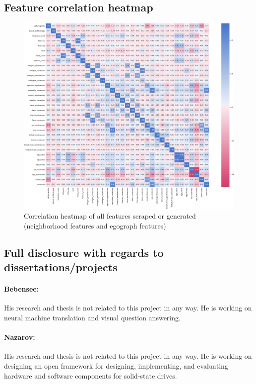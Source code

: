 \subsection{Feature correlation heatmap} \label{fig:corr}

\begin{figure}[H]
    \centering
    \includegraphics[width=\textwidth]{FIG/corr.pdf}
    \caption{Correlation heatmap of all features scraped or generated (neighborhood features and egograph features)}
\end{figure}

\subsection{Full disclosure with regards to dissertations/projects}

\paragraph{Bebensee:}
His research and thesis is not related to this project in any way. He is working on neural machine translation and visual question answering.

\paragraph{Nazarov:}
His research and thesis is not related to this project in any way. He is working on designing an open framework for designing, implementing, and evaluating hardware and software components for solid-state drives. 